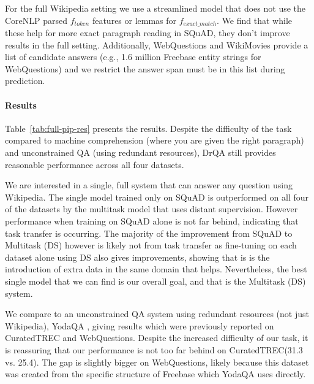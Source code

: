 \documentclass[11pt,a4paper]{article}
\newcommand\lcurq{CuratedTREC\xspace}
\newcommand\wq{WebQuestions\xspace}
\newcommand\us{DrQA\xspace}
\begin{document}
For the full Wikipedia setting we use a streamlined model that does not use the CoreNLP parsed $f_{token}$ features or lemmas for $f_{exact\_match}$. We find that while these help for more exact paragraph reading in SQuAD, they don't improve results in the full setting. Additionally, WebQuestions and WikiMovies provide a list of candidate answers (e.g., 1.6 million Freebase entity strings for WebQuestions) and we restrict the answer span must be in this list during prediction.

\paragraph{Results}
Table~\ref{tab:full-pip-res} presents the results.
Despite the difficulty of the task compared to machine comprehension (where you are given the right paragraph) and unconstrained QA (using redundant resources), \us still provides reasonable performance across all four datasets.

We are interested in a single, full system that can answer any question using Wikipedia. The single model trained only on SQuAD is outperformed on all four of the datasets by the multitask model that uses distant supervision.
However performance when training on SQuAD alone is not far behind, indicating that task transfer is occurring.
The majority of the improvement from SQuAD to Multitask (DS) however is likely not from task transfer as fine-tuning on each dataset alone using DS also gives improvements, showing that is is the introduction of extra data in the same domain that helps. Nevertheless, the best single model that we can find is our overall goal, and that is the Multitask (DS) system.





We compare to an unconstrained QA system using redundant resources (not just Wikipedia), YodaQA \cite{baudivs2015yodaqa}, giving results which were previously reported on \lcurq and \wq. Despite the increased difficulty of our task, it is reassuring that our performance is not too far behind on \lcurq (31.3 vs. 25.4). The gap is slightly bigger on \wq, likely because this dataset was created from the specific structure of Freebase which YodaQA uses directly.
\end{document}
